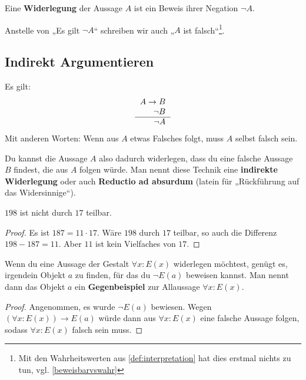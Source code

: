 \begin{defin}[Widerlegung] 
    Eine \textbf{Widerlegung} der Aussage $A$ ist ein Beweis ihrer Negation $\neg A$.
    
    Anstelle von „Es gilt $\neg A$“ schreiben wir auch „$A$ ist falsch“\footnote{Mit den Wahrheitswerten aus \cref{def:interpretation} hat dies erstmal nichts zu tun, vgl. \cref{beweisbarvswahr}}.
\end{defin}


\subsection*{Indirekt Argumentieren}


\begin{axiom} \label{reductio}
    Es gilt:
    \[\begin{tabular}{r}
        $A\to B$ \\
        $\neg B$ \\ \hline
        $\neg A$
    \end{tabular} \]
    Mit anderen Worten: Wenn aus $A$ etwas Falsches folgt, muss $A$ selbst falsch sein.
    
    Du kannst die Aussage $A$ also dadurch widerlegen, dass du eine falsche Aussage $B$ findest, die aus $A$ folgen würde. Man nennt diese Technik eine \textbf{indirekte Widerlegung} oder auch \textbf{Reductio ad absurdum} (latein für „Rückführung auf das Widersinnige“).
\end{axiom}


\begin{bsp} \label{bsp:reductio}
    $198$ ist nicht durch $17$ teilbar.
\end{bsp}
\begin{proof}
    Es ist $187=11\cdot 17$. Wäre $198$ durch $17$ teilbar, so auch die Differenz $198-187 = 11$. Aber $11$ ist kein Vielfaches von $17$.
\end{proof}


\begin{satz} \label{gegenbeispiel} 
    Wenn du eine Aussage der Gestalt $\forall x: E(x)$ widerlegen möchtest, genügt es, irgendein Objekt $a$ zu finden, für das du $\neg E(a)$ beweisen kannst. Man nennt dann das Objekt $a$ ein \textbf{Gegenbeispiel} zur Allaussage $\forall x: E(x)$.
\end{satz}
\begin{proof}
    Angenommen, es wurde $\neg E(a)$ bewiesen. Wegen $(\forall x: E(x)) \to E(a)$ würde dann aus $\forall x:E(x)$ eine falsche Aussage folgen, sodass $\forall x:E(x)$ falsch sein muss.
\end{proof}

